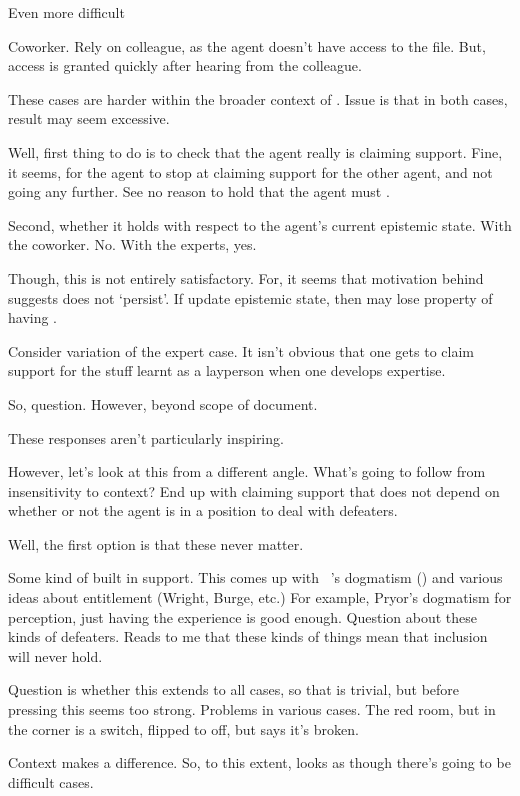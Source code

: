 \begin{note}
  Even more difficult

  Coworker.
  Rely on colleague, as the agent doesn't have access to the file.
  But, access is granted quickly after hearing from the colleague.
\end{note}

\begin{note}
  These cases are harder within the broader context of \ideaCS{}.
  Issue is that in both cases, result may seem excessive.

  Well, first thing to do is to check that the agent really is claiming support.
  Fine, it seems, for the agent to stop at claiming support for the other agent, and not going any further.
  See no reason to hold that the agent must \csN{}.

  Second, whether it holds with respect to the agent's current epistemic state.
  With the coworker.
  No.
  With the experts, yes.

  Though, this is not entirely satisfactory.
  For, it seems that motivation behind \ideaCS{} suggests \csVed{} does not `persist'.
  If update epistemic state, then may lose property of having \csVed{}.

  Consider variation of the expert case.
  It isn't obvious that one gets to claim support for the stuff learnt as a layperson when one develops expertise.

  So, question.
  However, beyond scope of document.
\end{note}

\begin{note}[Uninspiring]
  These responses aren't particularly inspiring.

  However, let's look at this from a different angle.
  What's going to follow from insensitivity to context?
  End up with claiming support that does not depend on whether or not the agent is in a position to deal with defeaters.

  Well, the first option is that these never matter.

  Some kind of built in support.
  This comes up with ~\citeauthor{Pryor:2012tq}'s dogmatism (\cite{Pryor:2000tl,Pryor:2012tq}) and various ideas about entitlement (Wright, Burge, etc.)
  For example, Pryor's dogmatism for perception, just having the experience is good enough.
  Question about these kinds of defeaters.
  Reads to me that these kinds of things mean that {\color{red} inclusion} will never hold.

  Question is whether this extends to all cases, so that \nI{} is trivial, but before pressing this seems too strong.
  Problems in various cases.
  The red room, but in the corner is a switch, flipped to off, but says it's broken.

  Context makes a difference.
  So, to this extent, looks as though there's going to be difficult cases.
\end{note}

